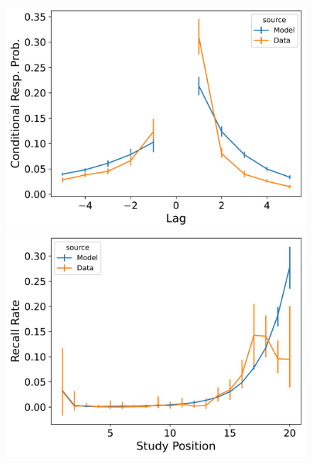 \documentclass[
  letterpaper,
  11pt,
  english,
  singlespacing,
  headsepline]{MastersDoctoralThesis}
\begin{document}
\begin{figure}
\begin{minipage}{0.33\linewidth}
\includegraphics{icmr_figures/Murdock1962_TraceScalingCMR_Model_Fitting_LL20_crp-1.png}\end{minipage}%
%
\begin{minipage}{0.33\linewidth}
\includegraphics{icmr_figures/Murdock1962_TraceScalingCMR_Model_Fitting_LL20_pnr-1.png}\end{minipage}%
%
\begin{minipage}{0.33\linewidth}

\end{minipage}
\end{figure}
\end{document}
